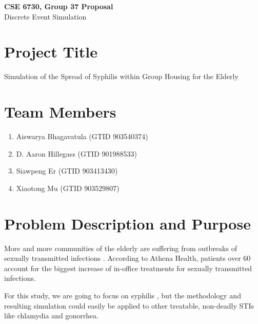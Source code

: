 \documentclass{article}
\begin{document}
	\begin{center}
    
		\LARGE{\textbf{CSE 6730, Group 37 Proposal}} \\
        \vspace{1em}
        \Large{Discrete Event Simulation} \\
     
	\end{center}
    \begin{normalsize}
    
    	\section{Project Title}
        
Simulation of the Spread of Syphilis within Group Housing for the Elderly
      
		\section{Team Members}
        
      \begin{enumerate}
      	\item Aiswarya Bhagavatula (GTID 903540374)
      	\item D. Aaron Hillegass (GTID 901988533)
      	\item Siawpeng Er (GTID 903413430)
      	\item Xiaotong Mu (GTID 903529807)
      \end{enumerate}
        
	   	\section{Problem Description and Purpose}
        
    More and more communities of the elderly are suffering from outbreaks of sexually transmitted infections \cite{mcdaniel_2017}. According to Athena Health, patients over 60 account for the biggest increase of in-office treatments for sexually transmitted infections.
    
    For this study, we are going to focus on syphilis \cite{cdc} , but the methodology and resulting simulation could easily be applied to other treatable, non-deadly STIs like chlamydia and gonorrhea.
    

\end{normalsize}
\end{document}

